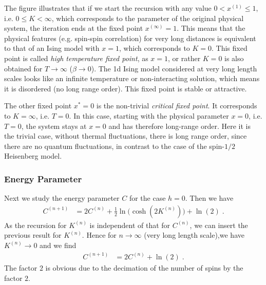 The figure illustrates that if we start the recursion with any value $0< x^{(1)}\le 1$, i.e. $0\le  K< \infty$, which 
corresponds to the parameter of the original physical system, the iteration ends at the fixed point 
$x^{(\infty)}=1$. This means that the physical features (e.g. spin-spin correlation)
for very long distances is equivalent to that of an Ising model with $x=1$, which corresponds to $K=0$. This fixed point is called {\em high temperature fixed point}, as
$x=1$, or rather $K=0$ is also obtained for $T\to \infty$ ($\beta\to 0$).
The 1d Ising model considered at very long length scales looks like an infinite temperature 
or non-interacting solution, which means it is disordered (no long range order).
This fixed point is stable or attractive.

The other fixed point $x^{*}=0$ is the non-trivial {\em critical fixed point}.  It corresponds to $K=\infty$, i.e. $T=0$.
In this case, starting with the physical parameter $x=0$, i.e. $T=0$, the system stays at $x=0$
and has therefore long-range order.
Here it is the trivial case, without thermal fluctuations, there
is long range order, since there are no quantum fluctuations,
in contrast to the case of the spin-$1/2$ Heisenberg model.




\subsubsection{Energy Parameter}
Next we study the energy parameter $C$ for the case $h=0$. Then we have
%
\begin{align}\label{eq:RNG:Energy:parameter}
 C^{(n+1)} &= 2 C^{(n)} + \frac{1}{2}\ln\bigg(\cosh(2K^{(n)})\bigg)+ \ln(2) \;.
\end{align}
%
As the recursion for $K^{(n)}$ is independent of that for
$C^{(n)}$, we can insert the previous result for $K^{(n)}$. Hence for $n\to\infty$ (very long length scale),we have $K^{(n)}\to 0$ and we find
%
\begin{align*}
 C^{(n+1)} &= 2C^{(n)} + \ln(2)\;.
\end{align*}
%
The factor $2$ is obvious due to the decimation of the number of spins by the factor $2$.

